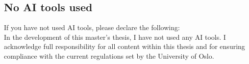 \subsection*{No AI tools used}
If you have not used AI tools, please declare the following:\\
In the development of this master's thesis, I have not used any AI tools. I acknowledge full responsibility for all content within this thesis and for ensuring compliance with the current regulations set by the University of Oslo.
